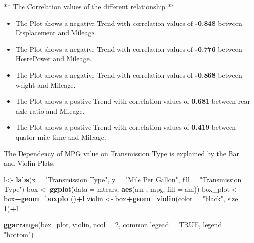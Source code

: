 \documentclass[
]{article}
\newenvironment{Shaded}{\begin{snugshade}}{\end{snugshade}}
\newcommand{\DataTypeTok}[1]{\textcolor[rgb]{0.13,0.29,0.53}{#1}}
\newcommand{\DecValTok}[1]{\textcolor[rgb]{0.00,0.00,0.81}{#1}}
\newcommand{\KeywordTok}[1]{\textcolor[rgb]{0.13,0.29,0.53}{\textbf{#1}}}
\newcommand{\NormalTok}[1]{#1}
\newcommand{\OperatorTok}[1]{\textcolor[rgb]{0.81,0.36,0.00}{\textbf{#1}}}
\newcommand{\OtherTok}[1]{\textcolor[rgb]{0.56,0.35,0.01}{#1}}
\newcommand{\StringTok}[1]{\textcolor[rgb]{0.31,0.60,0.02}{#1}}
\begin{document}
** The Correlation values of the different relationship **

\begin{itemize}
\item
  The Plot shows a negative Trend with correlation values of
  \textbf{-0.848} between Displacement and Mileage.
\item
  The Plot shows a negative Trend with correlation values of
  \textbf{-0.776} between HosrePower and Mileage.
\item
  The Plot shows a negative Trend with correlation values of
  \textbf{-0.868} between weight and Mileage.
\item
  The Plot shows a postive Trend with correlation values of
  \textbf{0.681} between rear axle ratio and Mileage.
\item
  The Plot shows a postive Trend with correlation values of
  \textbf{0.419} between quator mile time and Mileage.
\end{itemize}

The Dependency of MPG value on Transmission Type is explained by the Bar
and Violin Plots.

\begin{Shaded}
\begin{Highlighting}[]
\NormalTok{l<-}\StringTok{ }\KeywordTok{labs}\NormalTok{(}\DataTypeTok{x =} \StringTok{"Transmission Type"}\NormalTok{, }\DataTypeTok{y =} \StringTok{"Mile Per Gallon"}\NormalTok{, }\DataTypeTok{fill =} \StringTok{"Transmission Type"}\NormalTok{)}
\NormalTok{box <-}\StringTok{ }\KeywordTok{ggplot}\NormalTok{(}\DataTypeTok{data =}\NormalTok{ mtcars, }\KeywordTok{aes}\NormalTok{(am , mpg, }\DataTypeTok{fill =}\NormalTok{ am))}
\NormalTok{box_plot <-}\StringTok{ }\NormalTok{box}\OperatorTok{+}\KeywordTok{geom_boxplot}\NormalTok{()}\OperatorTok{+}\NormalTok{l}
\NormalTok{violin <-}\StringTok{ }\NormalTok{box}\OperatorTok{+}\KeywordTok{geom_violin}\NormalTok{(}\DataTypeTok{color =} \StringTok{"black"}\NormalTok{, }\DataTypeTok{size =} \DecValTok{1}\NormalTok{)}\OperatorTok{+}\NormalTok{l}

\KeywordTok{ggarrange}\NormalTok{(box_plot, violin, }\DataTypeTok{ncol =} \DecValTok{2}\NormalTok{, }\DataTypeTok{common.legend =} \OtherTok{TRUE}\NormalTok{, }\DataTypeTok{legend =} \StringTok{"bottom"}\NormalTok{)}
\end{Highlighting}
\end{Shaded}
\end{document}
